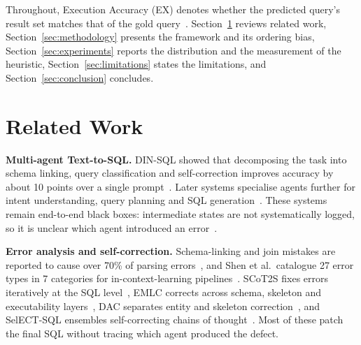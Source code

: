 \documentclass{llncs}
\begin{document}
Throughout, Execution Accuracy (EX) denotes whether the predicted query's
result set matches that of the gold query~\cite{yu_spider_2018}.
Section~\ref{sec:related} reviews related work, Section~\ref{sec:methodology}
presents the framework and its ordering bias, Section~\ref{sec:experiments}
reports the distribution and the measurement of the heuristic,
Section~\ref{sec:limitations} states the limitations, and
Section~\ref{sec:conclusion} concludes.

\section{Related Work}
\label{sec:related}

\noindent\textbf{Multi-agent Text-to-SQL.} DIN-SQL showed that decomposing the
task into schema linking, query classification and self-correction improves
accuracy by about 10 points over a single prompt~\cite{pourreza_din-sql_2023}.
Later systems specialise agents further for intent understanding, query
planning and SQL
generation~\cite{chaturvedi_sqlofthought_2025,wang_mac-sql_2025,cen_sqlfixagent_2025}.
These systems remain end-to-end black boxes: intermediate states are not
systematically logged, so it is unclear which agent introduced an
error~\cite{lei_spider2_2025}.

\noindent\textbf{Error analysis and self-correction.} Schema-linking and join
mistakes are reported to cause over 70\% of parsing
errors~\cite{zhu_scot2s_2025}, and Shen et al.\ catalogue 27 error types in 7
categories for in-context-learning pipelines~\cite{shen_icl_errors_2026}.
SCoT2S fixes errors iteratively at the SQL level~\cite{zhu_scot2s_2025}, EMLC
corrects across schema, skeleton and executability
layers~\cite{lei_emlc_2026}, DAC separates entity and skeleton
correction~\cite{wang_dac_2025}, and SelECT-SQL ensembles self-correcting
chains of thought~\cite{shen_select-sql_2024}. Most of these patch the final
SQL without tracing which agent produced the defect.
\end{document}
